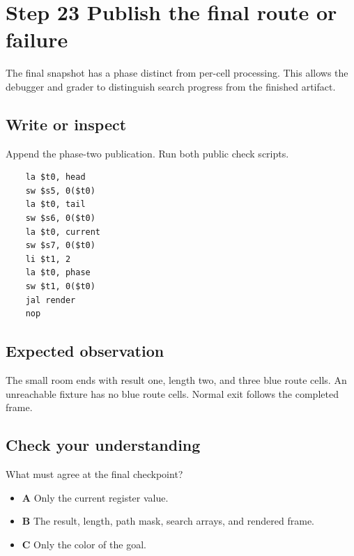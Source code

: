 \section{Step 23 Publish the final route or failure}\label{maze-s23}

The final snapshot has a phase distinct from per-cell processing. This allows the debugger and grader to distinguish search progress from the finished artifact.

\subsection{Write or inspect}

Append the phase-two publication. Run both public check scripts.

\begin{verbatim}
    la $t0, head
    sw $s5, 0($t0)
    la $t0, tail
    sw $s6, 0($t0)
    la $t0, current
    sw $s7, 0($t0)
    li $t1, 2
    la $t0, phase
    sw $t1, 0($t0)
    jal render
    nop
\end{verbatim}

\subsection{Expected observation}

The small room ends with result one, length two, and three blue route cells. An unreachable fixture has no blue route cells. Normal exit follows the completed frame.

\subsection{Check your understanding}

What must agree at the final checkpoint?

\begin{itemize}
  \item \textbf{A} Only the current register value.
  \item \textbf{B} The result, length, path mask, search arrays, and rendered frame.
  \item \textbf{C} Only the color of the goal.
\end{itemize}
